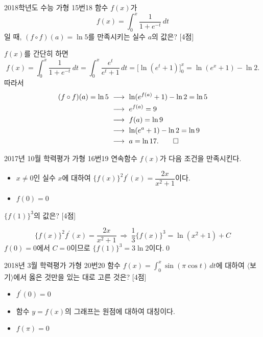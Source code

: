 \documentclass{article}
\begin{document}
\newpage
\begin{prob}{2018학년도 수능 가형 15번}{18}
	함수 $f(x)$가
	\[
		f(x)=\int_0^x\frac{1}{1+e^{-t}}\,dt
	\]
	일 때, $(f\circ f)(a)=\ln5$를 만족시키는 실수 $a$의 값은? [4점]
\end{prob}

\begin{sol}
	$f(x)$를 간단히 하면
	\[
		f(x)=\int_0^x\frac{1}{1+e^{-t}}\,dt=\int_0^x\frac{e^t}{e^t+1}\,dt=\biggl[\ln(e^t+1)\biggr]_0^x=\ln(e^x+1)-\ln 2.
	\]
	따라서
	\[
		\begin{aligned}
			(f\circ f)(a)=\ln5~&\longrightarrow~\ln(e^{f(a)}+1)-\ln2 =\ln 5\\
			&\longrightarrow~e^{f(a)}=9\\
			&\longrightarrow~f(a)=\ln 9\\
			&\longrightarrow~\ln(e^a+1)-\ln 2=\ln 9\\
			&\longrightarrow~a=\ln 17.\qed
		\end{aligned}
	\]
\end{sol}

\newpage
\begin{prob}{2017년 10월 학력평가 가형 16번}{19}
	연속함수 $f(x)$가 다음 조건을 만족시킨다.
	\begin{hint}
		\begin{itemize}
			\item[(가)] $x\ne 0$인 실수 $x$에 대하여 $\{f(x)\}^2f^{\prime}(x)=\dfrac{2x}{x^2+1}$이다.
			\item[(나)] $f(0)=0$
		\end{itemize}
	\end{hint}
	$\{f(1)\}^3$의 값은? [4점]
\end{prob}

\begin{sol}
	\[
		\{f(x)\}^2f^{\prime}(x)=\dfrac{2x}{x^2+1}~\Longrightarrow~\frac{1}{3}\{f(x)\}^3=\ln(x^2+1)+C
	\]
	$f(0)=0$에서 $C=0$이므로 $\{f(1)\}^3=3\ln 2$이다.\qed
\end{sol}

\newpage
\begin{prob}{2018년 3월 학력평가 가형 20번}{20}
	함수 $f(x)=\displaystyle\int_0^x\sin(\pi\cos t)\,dt$에 대하여 $\langle$보기$\rangle$에서 옳은 것만을 있는 대로 고른 것은? [4점]
	\begin{hint}[보기]
		\begin{itemize}
			\item[ㄱ.] $f^{\prime}(0)=0$
			\item[ㄴ.] 함수 $y=f(x)$의 그래프는 원점에 대하여 대칭이다.
			\item[ㄷ.] $f(\pi)=0$
		\end{itemize}
	\end{hint}
\end{prob}
\end{document}
